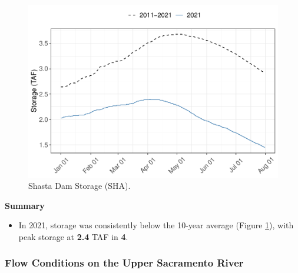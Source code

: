 \documentclass[
]{book}
\providecommand{\tightlist}{%
  \setlength{\itemsep}{0pt}\setlength{\parskip}{0pt}}
\theoremstyle{definition}
\theoremstyle{definition}
\theoremstyle{definition}
\theoremstyle{definition}
\theoremstyle{remark}
\begin{document}
\begin{figure}
\centering
\includegraphics{_main_files/figure-latex/SHAstor-fig-1.pdf}
\caption{\label{fig:SHAstor-fig}Shasta Dam Storage (SHA).}
\end{figure}

\textbf{Summary}

\begin{itemize}
\tightlist
\item
  In 2021, storage was consistently below the 10-year average (Figure \ref{fig:SHAstor-fig}), with peak storage at \textbf{2.4} TAF in \textbf{4}.
\end{itemize}

\hypertarget{flow-conditions-on-the-upper-sacramento-river}{%
\subsubsection{Flow Conditions on the Upper Sacramento River}\label{flow-conditions-on-the-upper-sacramento-river}}
\end{document}
